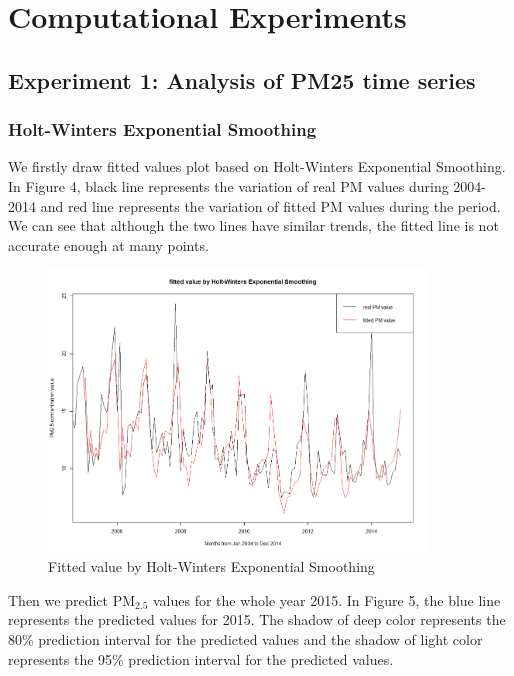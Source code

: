 \documentclass[10pt]{article}
\begin{document}
\section{Computational Experiments}

\subsection{Experiment 1: Analysis of PM25 time series}

\subsubsection{Holt-Winters Exponential Smoothing}
We firstly draw fitted values plot based on Holt-Winters Exponential Smoothing. In Figure 4, black line represents the variation of real PM values during 2004-2014 and red line represents the variation of fitted PM values during the period. We can see that although the two lines have similar trends, the fitted line is not accurate enough at many points.

\begin{figure}[H]
\centering
\includegraphics[width = 100mm]{ts2.png}
\caption{Fitted value by Holt-Winters Exponential Smoothing}
\end{figure}

Then we predict PM$_{2.5}$ values for the whole year 2015. In Figure 5, the blue line represents the predicted values for 2015. The shadow of deep color represents the 80\% prediction interval for the predicted values and the shadow of light color represents the 95\% prediction interval for the predicted values.
\end{document}

